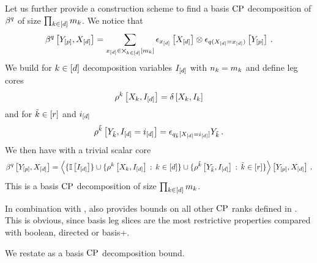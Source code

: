 Let us further provide a construction scheme to find a basis $\mathrm{CP}$ decomposition of $\beta^{q}$ of size $\prod_{k\in[d]}m_{k}$.
We notice that
\begin{align*}
    \beta^{q}\left[Y_{[p]},X_{[d]}\right]
    = \sum_{x_{[d]}\in\bigtimes_{k\in[d]}[m_{k}]} \epsilon_{x_{[d]}}\left[X_{[d]}\right] \otimes \epsilon_{q(X_{[d]}=x_{[d]})}\left[Y_{[p]}\right] \, .
\end{align*}
We build for $k\in[d]$ decomposition variables $I_{[d]}$ with $n_{k}=m_{k}$ and define leg cores %
\begin{align*}
    \rho^{k}\left[X_{k},I_{[d]}\right] = \delta\left[X_{k},I_{k}\right]
\end{align*}
and for $\tilde{k}\in[r]$ and $i_{[d]}$
\begin{align*}
    \rho^{\tilde{k}}\left[Y_{\tilde{k}},I_{[d]}=i_{[d]}\right]
    = \epsilon_{q_{\tilde{k}}[X_{[d]}=i_{[d]}]}{Y_{\tilde{k}}} \, .
\end{align*}
We then have with a trivial scalar core
\begin{align*}
    \beta^{q}\left[Y_{[p]},X_{[d]}\right]
    = \left\langle 
        \{\mathbb{I}\left[I_{[d]}\right]\}\cup
        \{\rho^{k}\left[X_{k},I_{[d]}\right] \,:\, k\in[d]\} \cup
        \{\rho^{\tilde{k}}\left[Y_{\tilde{k}},I_{[d]}\right] \,:\, \tilde{k}\in[r]\}
    \right\rangle \left[ Y_{[p]},X_{[d]} \right] \, .
\end{align*}
This is a basis $\mathrm{CP}$ decomposition of size $\prod_{k\in[d]}m_{k}$.

In combination with ,  also provides bounds on all other $\mathrm{CP}$ ranks defined in .
This is obvious, since basis leg slices are the most restrictive properties compared with boolean, directed or basis+.


We restate  as a basis $\mathrm{CP}$ decomposition bound.

